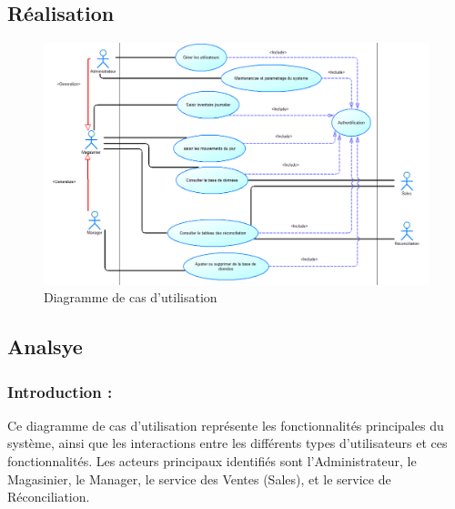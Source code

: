 \documentclass[a4paper, oneside, 12pt, final]{extreport}
\begin{document}
\subsection{Réalisation}
\begin{figure}[h]
    \centering
    \includegraphics[width=1\textwidth]{USE CASE.png} %
    \caption{Diagramme de cas d'utilisation}
    \label{fig:Diagramme de cas d'utilisation}
\end{figure}
\newpage
\subsection{Analsye}
\subsubsection{Introduction :}
Ce diagramme de cas d'utilisation représente les fonctionnalités principales du système, ainsi que les interactions entre les différents types d'utilisateurs et ces fonctionnalités. Les acteurs principaux identifiés sont l'Administrateur, le Magasinier, le Manager, le service des Ventes (Sales), et le service de Réconciliation.
\end{document}
